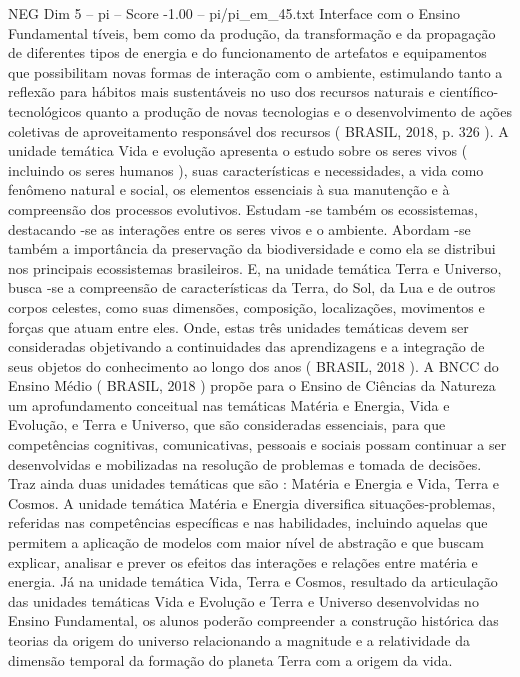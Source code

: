 \begin{textsample}{NEG Dim 5 – pi – Score -1.00 – pi/pi\_em\_45.txt}  \label{ex:f5_neg_057}
Interface com o Ensino Fundamental tíveis, bem como da produção, da transformação e da propagação de diferentes tipos de energia e do funcionamento de artefatos e equipamentos que possibilitam novas formas de interação com o ambiente, estimulando tanto a reflexão para hábitos mais sustentáveis no uso dos recursos naturais e científico-tecnológicos quanto a produção de novas tecnologias e o desenvolvimento de ações coletivas de aproveitamento responsável dos recursos ( BRASIL, 2018, p. 326 ).
A unidade temática Vida e evolução apresenta o estudo sobre os seres vivos ( incluindo os seres humanos ), suas características e necessidades, a vida como fenômeno natural e social, os elementos essenciais à sua manutenção e à compreensão dos processos evolutivos.
Estudam -se também os ecossistemas, destacando -se as interações entre os seres vivos e o ambiente.
Abordam -se também a importância da preservação da biodiversidade e como ela se distribui nos principais ecossistemas brasileiros.
E, na unidade temática Terra e Universo, busca -se a compreensão de características da Terra, do Sol, da Lua e de outros corpos celestes, como suas dimensões, composição, localizações, movimentos e forças que atuam entre eles.
Onde, estas três unidades temáticas devem ser consideradas objetivando a continuidades das aprendizagens e a integração de seus objetos do conhecimento ao longo dos anos ( BRASIL, 2018 ).
A BNCC do Ensino Médio ( BRASIL, 2018 ) propõe para o Ensino de Ciências da Natureza um aprofundamento conceitual nas temáticas Matéria e Energia, Vida e Evolução, e Terra e Universo, que são consideradas essenciais, para que competências cognitivas, comunicativas, pessoais e sociais possam continuar a ser desenvolvidas e mobilizadas na resolução de problemas e tomada de decisões.
Traz ainda duas unidades temáticas que são : Matéria e Energia e Vida, Terra e Cosmos.
A unidade temática Matéria e Energia diversifica situações-problemas, referidas nas competências específicas e nas habilidades, incluindo aquelas que permitem a aplicação de modelos com maior nível de abstração e que buscam explicar, analisar e prever os efeitos das interações e relações entre matéria e energia.
Já na unidade temática Vida, Terra e Cosmos, resultado da articulação das unidades temáticas Vida e Evolução e Terra e Universo desenvolvidas no Ensino Fundamental, os alunos poderão compreender a construção histórica das teorias da origem do universo relacionando a magnitude e a relatividade da dimensão temporal da formação do planeta Terra com a origem da vida.

\end{textsample}
